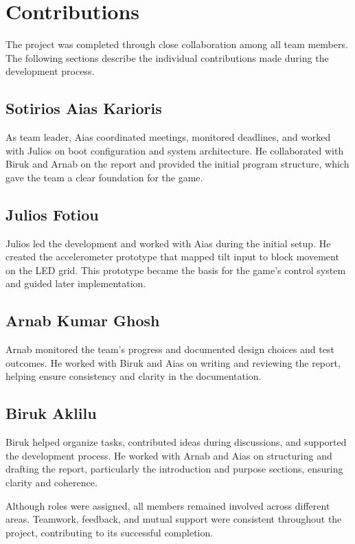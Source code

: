 \documentclass[12pt]{report}
\begin{document}
\chapter{Contributions}

The project was completed through close collaboration among all team members. The following sections describe the individual contributions made during the development process.

\section{Sotirios Aias Karioris}
As team leader, Aias coordinated meetings, monitored deadlines, and worked with Julios on boot configuration and system architecture. He collaborated with Biruk and Arnab on the report and provided the initial program structure, which gave the team a clear foundation for the game.

\section{Julios Fotiou}
Julios led the development and worked with Aias during the initial setup. He created the accelerometer prototype that mapped tilt input to block movement on the LED grid. This prototype became the basis for the game's control system and guided later implementation.

\section{Arnab Kumar Ghosh}
Arnab monitored the team’s progress and documented design choices and test outcomes. He worked with Biruk and Aias on writing and reviewing the report, helping ensure consistency and clarity in the documentation.

\section{Biruk Aklilu}
Biruk helped organize tasks, contributed ideas during discussions, and supported the development process. He worked with Arnab and Aias on structuring and drafting the report, particularly the introduction and purpose sections, ensuring clarity and coherence.

\vspace{3ex}
Although roles were assigned, all members remained involved across different areas. Teamwork, feedback, and mutual support were consistent throughout the project, contributing to its successful completion.
\end{document}
